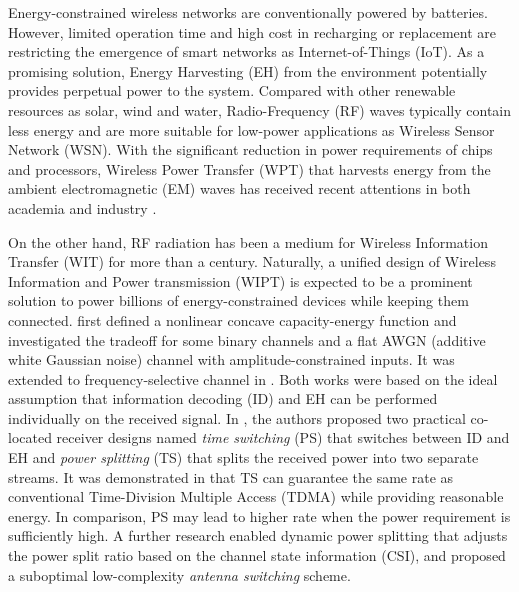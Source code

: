Energy-constrained wireless networks are conventionally powered by batteries. However, limited operation time and high cost in recharging or replacement are restricting the emergence of smart networks as Internet-of-Things (IoT). As a promising solution, Energy Harvesting (EH) from the environment potentially provides perpetual power to the system. Compared with other renewable resources as solar, wind and water, Radio-Frequency (RF) waves typically contain less energy and are more suitable for low-power applications as Wireless Sensor Network (WSN). With the significant reduction in power requirements of chips and processors, Wireless Power Transfer (WPT) that harvests energy from the ambient electromagnetic (EM) waves has received recent attentions in both academia and industry \cite{R.Varshney2008,Grover2010,Zhang2013,Hui2014,Krikidis2014,Valenta2014,Boshkovska2015,Ding2015,Costanzo2016,Clerckx2018a}.

On the other hand, RF radiation has been a medium for Wireless Information Transfer (WIT) for more than a century. Naturally, a unified design of Wireless Information and Power transmission (WIPT) is expected to be a prominent solution to power billions of energy-constrained devices while keeping them connected. \cite{R.Varshney2008} first defined a nonlinear concave capacity-energy function and investigated the tradeoff for some binary channels and a flat AWGN (additive white Gaussian noise) channel with amplitude-constrained inputs. It was extended to frequency-selective channel in \cite{Grover2010}. Both works were based on the ideal assumption that information decoding (ID) and EH can be performed individually on the received signal. In \cite{Zhang2013}, the authors proposed two practical co-located receiver designs named \textit{time switching} (PS) that switches between ID and EH and \textit{power splitting} (TS) that splits the received power into two separate streams. It was demonstrated in \cite{Zhou2013a} that TS can guarantee the same rate as conventional Time-Division Multiple Access (TDMA) while providing reasonable energy. In comparison, PS may lead to higher rate when the power requirement is sufficiently high. A further research \cite{Liu2013} enabled dynamic power splitting that adjusts the power split ratio based on the channel state information (CSI), and proposed a suboptimal low-complexity \textit{antenna switching} scheme. 